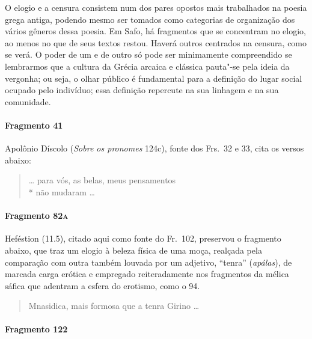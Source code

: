 O elogio e a censura consistem num dos pares opostos mais trabalhados na poesia
grega antiga, podendo mesmo ser tomados como categorias de organização dos
vários gêneros dessa poesia. Em Safo, há fragmentos que se concentram no
elogio, ao menos no que de seus textos restou. Haverá outros centrados na
censura, como se verá. O poder de um e de outro só pode ser
minimamente compreendido se lembrarmos que a cultura da Grécia arcaica e
clássica pauta"-se pela ideia da vergonha; ou seja, o olhar público é
fundamental para a definição do lugar social ocupado pelo indivíduo; essa
definição repercute na sua linhagem e na sua comunidade. 

\paragraph{Fragmento 41}

{\small Apolônio Díscolo (\textit{Sobre os pronomes} 124c), fonte dos Frs.~32 e 33, cita os versos abaixo:}

\begin{verse}
\ldots{} para vós, as belas, meus pensamentos\\*
não mudaram \ldots{}
\end{verse}

\paragraph{Fragmento 82\textsc{a}}

{\small Heféstion (11.5), citado aqui como fonte do Fr.~102, preservou o fragmento abaixo, que traz
um elogio à beleza física de uma moça, realçada pela comparação com outra
também louvada por um adjetivo, ``tenra” (\textit{apálas}), de marcada
carga erótica e empregado reiteradamente nos fragmentos da mélica sáfica que
adentram a esfera do erotismo, como o 94.}

\begin{verse}
Mnasidica, mais formosa que a tenra Girino \ldots{}
\end{verse}


\paragraph{Fragmento 122}

